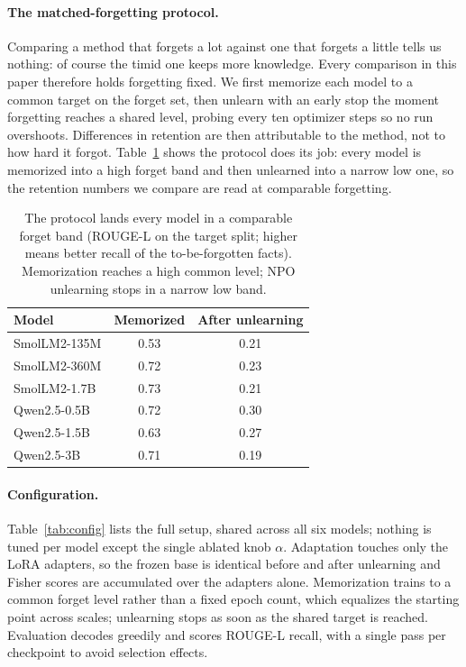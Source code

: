 \documentclass[sigconf,nonacm]{acmart}
\begin{document}
\paragraph{The matched-forgetting protocol.} Comparing a method that forgets a lot against one that forgets a little tells us nothing: of course the timid one keeps more knowledge. Every comparison in this paper therefore holds forgetting fixed. We first memorize each model to a common target on the forget set, then unlearn with an early stop the moment forgetting reaches a shared level, probing every ten optimizer steps so no run overshoots. Differences in retention are then attributable to the method, not to how hard it forgot. Table~\ref{tab:protocol} shows the protocol does its job: every model is memorized into a high forget band and then unlearned into a narrow low one, so the retention numbers we compare are read at comparable forgetting.

\begin{table}[t]
\centering
\caption{The protocol lands every model in a comparable forget band (ROUGE-L on the target split; higher means better recall of the to-be-forgotten facts). Memorization reaches a high common level; NPO unlearning stops in a narrow low band.}
\label{tab:protocol}
\small
\begin{tabular}{lcc}
\toprule
\rowcolor{hiA} \textbf{Model} & \textbf{Memorized} & \textbf{After unlearning} \\
\midrule
SmolLM2-135M & 0.53 & \cellcolor{inkC!12}0.21 \\
\rowcolor{hiB} SmolLM2-360M & 0.72 & \cellcolor{inkC!12}0.23 \\
SmolLM2-1.7B & 0.73 & \cellcolor{inkC!12}0.21 \\
\rowcolor{hiB} Qwen2.5-0.5B & 0.72 & \cellcolor{inkC!12}0.30 \\
Qwen2.5-1.5B & 0.63 & \cellcolor{inkC!12}0.27 \\
\rowcolor{hiB} Qwen2.5-3B   & 0.71 & \cellcolor{inkC!12}0.19 \\
\bottomrule
\end{tabular}
\end{table}

\paragraph{Configuration.} Table~\ref{tab:config} lists the full setup, shared across all six models; nothing is tuned per model except the single ablated knob $\alpha$. Adaptation touches only the LoRA adapters, so the frozen base is identical before and after unlearning and Fisher scores are accumulated over the adapters alone. Memorization trains to a common forget level rather than a fixed epoch count, which equalizes the starting point across scales; unlearning stops as soon as the shared target is reached. Evaluation decodes greedily and scores ROUGE-L recall, with a single pass per checkpoint to avoid selection effects.
\end{document}

